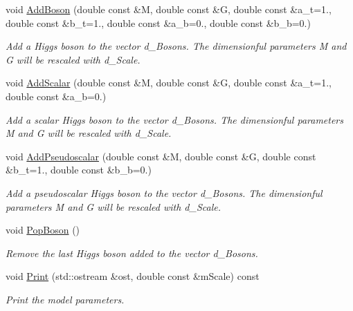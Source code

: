 \begin{DoxyCompactItemize}
\item 
void \hyperlink{classHiggsModel_acd87bf9a85c37da737aba62a0dc82b5b}{Add\+Boson} (double const \&M, double const \&G, double const \&a\+\_\+t=1., double const \&b\+\_\+t=1., double const \&a\+\_\+b=0., double const \&b\+\_\+b=0.)
\begin{DoxyCompactList}\small\item\em Add a Higgs boson to the vector d\+\_\+\+Bosons. The dimensionful parameters M and G will be rescaled with d\+\_\+\+Scale. \end{DoxyCompactList}\item 
void \hyperlink{classHiggsModel_ab84c9016bf5a8bd87f82f214c34cce8b}{Add\+Scalar} (double const \&M, double const \&G, double const \&a\+\_\+t=1., double const \&a\+\_\+b=0.)
\begin{DoxyCompactList}\small\item\em Add a scalar Higgs boson to the vector d\+\_\+\+Bosons. The dimensionful parameters M and G will be rescaled with d\+\_\+\+Scale. \end{DoxyCompactList}\item 
void \hyperlink{classHiggsModel_a94f5b60024363838e73e0e1b8d1604ca}{Add\+Pseudoscalar} (double const \&M, double const \&G, double const \&b\+\_\+t=1., double const \&b\+\_\+b=0.)
\begin{DoxyCompactList}\small\item\em Add a pseudoscalar Higgs boson to the vector d\+\_\+\+Bosons. The dimensionful parameters M and G will be rescaled with d\+\_\+\+Scale. \end{DoxyCompactList}\item 
\hypertarget{classHiggsModel_a7aea18c2e6622159e8f6cc29be537c0f}{}void \hyperlink{classHiggsModel_a7aea18c2e6622159e8f6cc29be537c0f}{Pop\+Boson} ()\label{classHiggsModel_a7aea18c2e6622159e8f6cc29be537c0f}

\begin{DoxyCompactList}\small\item\em Remove the last Higgs boson added to the vector d\+\_\+\+Bosons. \end{DoxyCompactList}\item 
void \hyperlink{classHiggsModel_a71e8fcd730feb01afd4c39f3cd184655}{Print} (std\+::ostream \&ost, double const \&m\+Scale) const 
\begin{DoxyCompactList}\small\item\em Print the model parameters. \end{DoxyCompactList}\end{DoxyCompactItemize}


